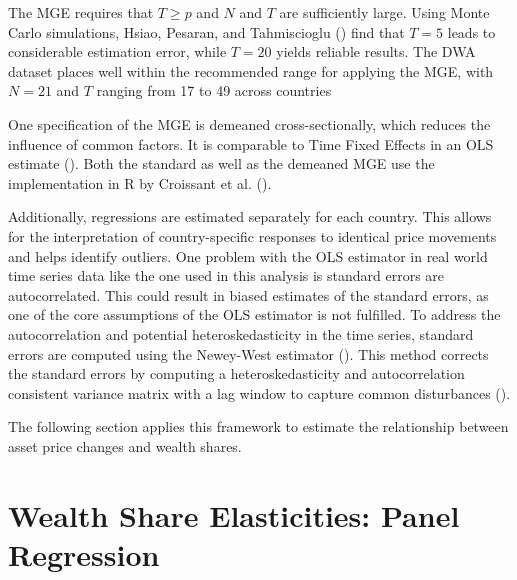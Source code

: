 \documentclass[
  a4paper,
  DIV=11,
  numbers=noendperiod]{scrartcl}
\begin{document}
The MGE requires that \(T \ge p\) and \(N\) and \(T\) are sufficiently
large. Using Monte Carlo simulations, Hsiao, Pesaran, and Tahmiscioglu
() find that
\(T=5\) leads to considerable estimation error, while \(T=20\) yields
reliable results. The DWA dataset places well within the recommended
range for applying the MGE, with \(N=21\) and \(T\) ranging from 17 to
49 across countries

One specification of the MGE is demeaned cross-sectionally, which
reduces the influence of common factors. It is comparable to Time Fixed
Effects in an OLS estimate
(). Both the standard as well as the demeaned MGE
use the implementation in R by Croissant et al.
().

Additionally, regressions are estimated separately for each country.
This allows for the interpretation of country-specific responses to
identical price movements and helps identify outliers. One problem with
the OLS estimator in real world time series data like the one used in
this analysis is standard errors are autocorrelated. This could result
in biased estimates of the standard errors, as one of the core
assumptions of the OLS estimator is not fulfilled. To address the
autocorrelation and potential heteroskedasticity in the time series,
standard errors are computed using the Newey-West estimator
(). This method corrects the standard errors by computing a
heteroskedasticity and autocorrelation consistent variance matrix with a
lag window to capture common disturbances
().

The following section applies this framework to estimate the
relationship between asset price changes and wealth shares.

\section{Wealth Share Elasticities: Panel Regression}\label{sec-panel}
\end{document}
